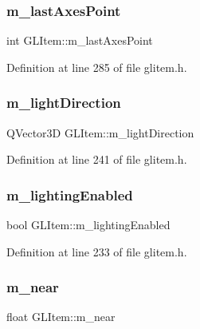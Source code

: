 \subsubsection{\texorpdfstring{m\_lastAxesPoint}{m\_lastAxesPoint}}
{\footnotesize\ttfamily int G\+L\+Item\+::m\+\_\+last\+Axes\+Point\hspace{0.3cm}{\ttfamily [protected]}}



Definition at line 285 of file glitem.\+h.

\mbox{\label{class_g_l_item_a1d3d64533872bf01a9d472554c371871}} 
\subsubsection{\texorpdfstring{m\_lightDirection}{m\_lightDirection}}
{\footnotesize\ttfamily Q\+Vector3D G\+L\+Item\+::m\+\_\+light\+Direction\hspace{0.3cm}{\ttfamily [protected]}}



Definition at line 241 of file glitem.\+h.

\mbox{\label{class_g_l_item_ad8770dd7051138df6a0da7b412254e34}} 
\subsubsection{\texorpdfstring{m\_lightingEnabled}{m\_lightingEnabled}}
{\footnotesize\ttfamily bool G\+L\+Item\+::m\+\_\+lighting\+Enabled\hspace{0.3cm}{\ttfamily [protected]}}



Definition at line 233 of file glitem.\+h.

\mbox{\label{class_g_l_item_ac811c5b957f441dedd62736a8feecb80}} 
\subsubsection{\texorpdfstring{m\_near}{m\_near}}
{\footnotesize\ttfamily float G\+L\+Item\+::m\+\_\+near\hspace{0.3cm}{\ttfamily [protected]}}



